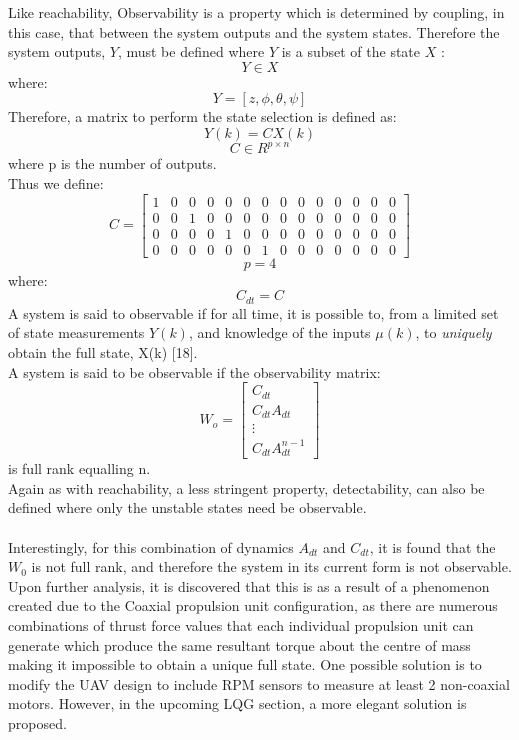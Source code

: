\documentclass[12pt,a4paper,twoside]{report}
\begin{document}
				Like reachability, Observability is a property which is determined by coupling, in this case, that between the system outputs and the system states. Therefore the system outputs, $Y$, must be defined where $Y$ is a subset of the state $X$ :
				\[
					Y \in X
				\]
				where:
				\begin{equation}
					Y = [z,\phi,\theta,\psi]
				\end{equation}
				Therefore, a matrix to perform the state selection is defined as:
				\\
				\begin{equation}
					Y(k) = CX(k)  
				\end{equation}
				\[
					C \in R^{p \times n}  
				\]
				where p is the number of outputs.
				\\
				Thus we define:
				\setcounter{MaxMatrixCols}{15}
				\begin{equation}
					C =
					\begin{bmatrix}
						1&0&0&0&0&0&0&0&0&0&0&0&0&0 \\
						0&0&1&0&0&0&0&0&0&0&0&0&0&0 \\
						0&0&0&0&1&0&0&0&0&0&0&0&0&0 \\
						0&0&0&0&0&0&1&0&0&0&0&0&0&0
					\end{bmatrix}  
				\end{equation}
				\[
					p = 4  
				\]
				where:
				\[
					C_{dt} = C
				\]
				A system is said to observable if for all time, it is possible to, from a limited set of state measurements $Y(k)$, and knowledge of the inputs $\mu(k)$, to \emph{uniquely} obtain the full state, X(k) [18].
				\\
				A system is said to be observable if the observability matrix:
				\begin{equation}
					W_o = 
					\begin{bmatrix}
						C_{dt}\\
						C_{dt}A_{dt}\\ 
						\vdots \\
						C_{dt}A_{dt}^{n-1}
					\end{bmatrix}
				\end{equation}
				is full rank equalling n.
				\\
				Again as with reachability, a less stringent property, detectability, can also be defined where only the unstable states need be observable.
				\\ \\
				Interestingly, for this combination of dynamics $A_{dt}$ and $C_{dt}$, it is found that the $W_0$ is not full rank, and therefore the system in its current form is not observable. Upon further analysis, it is discovered that this is as a result of a phenomenon created due to the Coaxial propulsion unit configuration, as there are numerous combinations of thrust force values that each individual propulsion unit can generate which produce the same resultant torque about the centre of mass making it impossible to obtain a unique full state. One possible solution is to modify the UAV design to include RPM sensors to measure at least 2 non-coaxial motors. However, in the upcoming LQG section, a more elegant solution is proposed.
		
\end{document}
